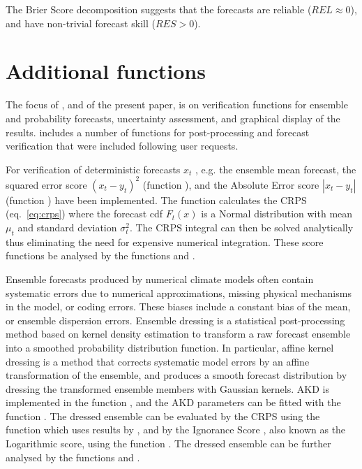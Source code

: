 \documentclass[article]{jss}\usepackage{graphicx, color}
\begin{document}
%
The Brier Score decomposition suggests that the forecasts are reliable ($REL\approx 0$), and have non-trivial forecast skill ($RES > 0$). 


\section{Additional functions}

The focus of , and of the present paper, is on verification functions for ensemble and probability forecasts, uncertainty assessment, and graphical display of the results.
 includes a number of functions for post-processing and forecast verification that were included following user requests.


For verification of deterministic forecasts $x_t$ , e.g. the ensemble mean forecast, the squared error score $(x_t - y_t)^2$ (function ), and the Absolute Error score $|x_t - y_t|$ (function ) have been implemented.
The function  calculates the CRPS (eq.~\ref{eq:crps}) where the forecast cdf $F_t(x)$ is a Normal distribution with mean $\mu_t$ and standard deviation $\sigma^2_t$.
The CRPS integral can then be solved analytically \citep{gneiting2005calibrated} thus eliminating the need for expensive numerical integration.
These score functions be analysed by the functions  and .


Ensemble forecasts produced by numerical climate models often contain systematic errors due to numerical approximations, missing physical mechanisms in the model, or coding errors.
These biases include a constant bias of the mean, or ensemble dispersion errors.
Ensemble dressing is a statistical post-processing method based on kernel density estimation to transform a raw forecast ensemble into a smoothed probability distribution function.
In particular, affine kernel dressing \citep[AKD; ][]{broecker2008from} is a method that corrects systematic model errors by an affine transformation of the ensemble, and produces a smooth forecast distribution by dressing the transformed ensemble members with Gaussian kernels.
AKD is implemented in the function , and the AKD parameters can be fitted with the function . 
The dressed ensemble can be evaluated by the CRPS using the function  which uses results by \citet{grimit2006the}, and by the Ignorance Score \citep{roulston2002evaluating}, also known as the Logarithmic score, using the function .
The dressed ensemble can be further analysed by the functions  and .
\end{document}
